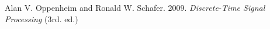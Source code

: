 \documentclass[preview]{standalone}
\begin{document}
\begin{center}
\raggedright Alan V. Oppenheim and Ronald W. Schafer. 2009. \textit{Discrete-Time Signal Processing} (3rd. ed.)
\end{center}
\end{document}
